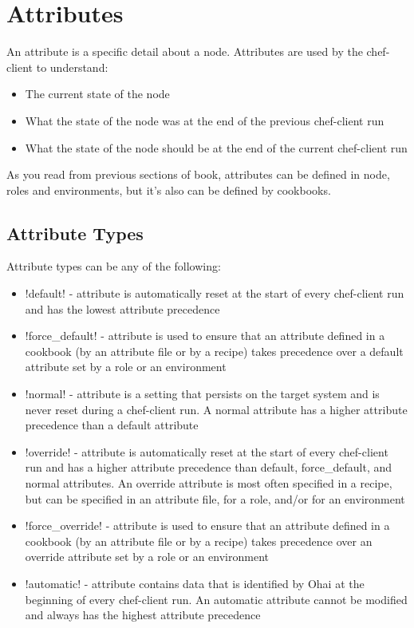 \section{Attributes}
\label{sec:server-attributes}

An attribute is a specific detail about a node. Attributes are used by the chef-client to understand:

\begin{itemize}
  \item The current state of the node
  \item What the state of the node was at the end of the previous chef-client run
  \item What the state of the node should be at the end of the current chef-client run
\end{itemize}

As you read from previous sections of book, attributes can be defined in node, roles and environments, but it's also can be defined by cookbooks.

\subsection{Attribute Types}

Attribute types can be any of the following:

\begin{itemize}
  \item \inline!default! - attribute is automatically reset at the start of every chef-client run and has the lowest attribute precedence
  \item \inline!force_default! - attribute is used to ensure that an attribute defined in a cookbook (by an attribute file or by a recipe) takes precedence over a default attribute set by a role or an environment
  \item \inline!normal! - attribute is a setting that persists on the target system and is never reset during a chef-client run. A normal attribute has a higher attribute precedence than a default attribute
  \item \inline!override! - attribute is automatically reset at the start of every chef-client run and has a higher attribute precedence than default, force\_default, and normal attributes. An override attribute is most often specified in a recipe, but can be specified in an attribute file, for a role, and/or for an environment
  \item \inline!force_override! - attribute is used to ensure that an attribute defined in a cookbook (by an attribute file or by a recipe) takes precedence over an override attribute set by a role or an environment
  \item \inline!automatic! - attribute contains data that is identified by Ohai at the beginning of every chef-client run. An automatic attribute cannot be modified and always has the highest attribute precedence
\end{itemize}

